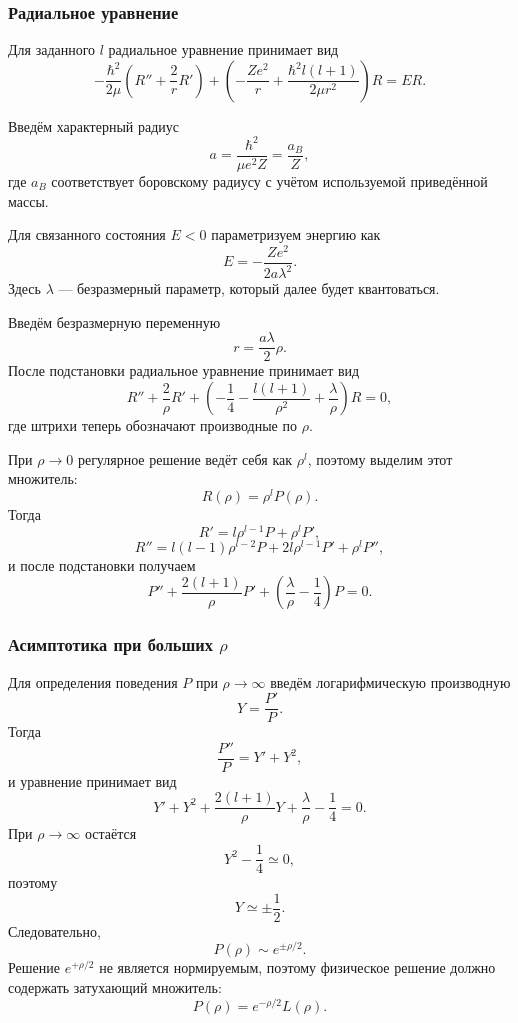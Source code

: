 \documentclass[12pt,a4paper]{article}
\begin{document}
\subsubsection{Радиальное уравнение}

Для заданного $l$ радиальное уравнение принимает вид
\[
    \boxed{
    -\frac{\hbar^2}{2\mu}
    \left(
        R''+\frac{2}{r}R'
    \right)
    +
    \left(
        -\frac{Ze^2}{r}
        +
        \frac{\hbar^2l(l+1)}{2\mu r^2}
    \right)R
    =
    ER
    }.
\]

Введём характерный радиус
\[
    \boxed{
        a
        =
        \frac{\hbar^2}{\mu e^2Z}
        =
        \frac{a_B}{Z}
    },
\]
где $a_B$ соответствует боровскому радиусу с учётом используемой
приведённой массы.

Для связанного состояния $E<0$ параметризуем энергию как
\[
    \boxed{
        E
        =
        -\frac{Ze^2}{2a\lambda^2}
    }.
\]
Здесь $\lambda$ --- безразмерный параметр, который далее будет
квантоваться.

Введём безразмерную переменную
\[
    \boxed{
        r=\frac{a\lambda}{2}\rho
    }.
\]
После подстановки радиальное уравнение принимает вид
\[
    \boxed{
    R''+
    \frac{2}{\rho}R'
    +
    \left(
        -\frac14
        -\frac{l(l+1)}{\rho^2}
        +\frac{\lambda}{\rho}
    \right)R
    =
    0
    },
\]
где штрихи теперь обозначают производные по $\rho$.

При $\rho\to0$ регулярное решение ведёт себя как $\rho^l$, поэтому
выделим этот множитель:
\[
    R(\rho)=\rho^lP(\rho).
\]
Тогда
\[
    R'
    =
    l\rho^{l-1}P+\rho^lP',
\]
\[
    R''
    =
    l(l-1)\rho^{l-2}P
    +
    2l\rho^{l-1}P'
    +
    \rho^lP'',
\]
и после подстановки получаем
\[
    \boxed{
    P''
    +
    \frac{2(l+1)}{\rho}P'
    +
    \left(
        \frac{\lambda}{\rho}
        -
        \frac14
    \right)P
    =
    0
    }.
\]

\subsubsection{Асимптотика при больших \texorpdfstring{$\rho$}{rho}}

Для определения поведения $P$ при $\rho\to\infty$ введём
логарифмическую производную
\[
    Y=\frac{P'}{P}.
\]
Тогда
\[
    \frac{P''}{P}=Y'+Y^2,
\]
и уравнение принимает вид
\[
    Y'
    +
    Y^2
    +
    \frac{2(l+1)}{\rho}Y
    +
    \frac{\lambda}{\rho}
    -
    \frac14
    =
    0.
\]
При $\rho\to\infty$ остаётся
\[
    Y^2-\frac14\simeq0,
\]
поэтому
\[
    Y\simeq\pm\frac12.
\]
Следовательно,
\[
    P(\rho)\sim e^{\pm\rho/2}.
\]
Решение $e^{+\rho/2}$ не является нормируемым, поэтому физическое
решение должно содержать затухающий множитель:
\[
    \boxed{
        P(\rho)=e^{-\rho/2}L(\rho)
    }.
\]
\end{document}
